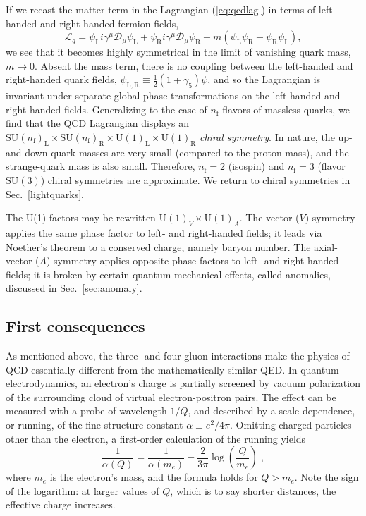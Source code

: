 \documentclass[prb,groupedaddress,nofootinbib,showpacs,twocolumn,floatfix]{revtex4}
\newcommand{\cfrac}[2]{{\textstyle \frac{#1}{#2}}}
\newcommand{\gtimes}{\times}
\newcommand{\D}{\ensuremath{\mathcal{D}}}
\begin{document}
If we recast the matter term in the Lagrangian (\ref{eq:qcdlag}) in
terms of left-handed and right-handed fermion fields,
\begin{equation}
	\mathcal{L}_{q} =
		\bar{\psi}_{\mathrm{L}}i\gamma^{\mu}\D_{\mu}\psi_{\mathrm{L}}
		+ \bar{\psi}_{\mathrm{R}}i\gamma^{\mu}\D_{\mu}\psi_{\mathrm{R}}
		-m\left(\bar{\psi}_{\mathrm{L}}\psi_{\mathrm{R}} +
		\bar{\psi}_{\mathrm{R}}\psi_{\mathrm{L}} \right),
    \label{eq:chiral}
\end{equation}
we see that it becomes highly symmetrical in the limit of vanishing
quark mass, $m \to 0$. Absent the mass term, there is no coupling
between the left-handed and right-handed quark fields,
$\psi_{\mathrm{L,R}} \equiv \cfrac{1}{2}(1 \mp \gamma_5)\psi$, and so
the Lagrangian is invariant under separate global phase transformations
on the left-handed and right-handed fields. Generalizing to the case of
$n_{\mathrm{f}}$ flavors of massless quarks, we find that the QCD
Lagrangian displays an
$\mathrm{SU(\mathit{n}_{\mathrm{f}})_L}\gtimes%
\mathrm{SU(\mathit{n}_{\mathrm{f}})_R}\gtimes%
\mathrm{U(1)_L}\gtimes\mathrm{U(1)_R}$
\emph{chiral symmetry}.
In nature, the up- and down-quark masses are very small (compared to 
the proton mass), and the strange-quark mass is also small.
Therefore, $n_{\mathrm{f}}=2$ (isospin) and $n_{\mathrm{f}}=3$ (flavor 
$\mathrm{SU}(3)$) chiral symmetries are approximate.
We return to chiral symmetries in Sec.~\ref{lightquarks}.

The U(1) factors may be rewritten $\mathrm{U}(1)_V\gtimes\mathrm{U}(1)_A$.
The vector ($V$) symmetry applies the same phase factor to left- and 
right-handed fields; it leads via Noether's theorem to a conserved 
charge, namely baryon number.
The axial-vector ($A$) symmetry applies opposite phase factors to left- 
and right-handed fields;
it is broken by certain quantum-mechanical effects, called anomalies, 
discussed in Sec.~\ref{sec:anomaly}.

\subsection{First consequences}
\label{sec:qcd:first}

As mentioned above, the three- and four-gluon interactions make the 
physics of QCD essentially different from the mathematically similar QED.
In quantum electrodynamics, an electron's charge is partially screened
by vacuum polarization of the surrounding cloud of virtual
electron-positron pairs.
The effect can be measured with a probe of wavelength $1/Q$, 
and described by a scale dependence, or running, of the fine structure 
constant $\alpha\equiv e^2/4\pi$.
Omitting charged particles other than the electron, a first-order 
calculation of the running yields
\begin{equation}
    \frac{1}{\alpha(Q)} = \frac{1}{\alpha(m_e)} - 
        \frac{2}{3\pi} \log\left(\frac{Q}{m_e}\right)\;,
\end{equation}
where $m_e$ is the electron's mass, and the formula holds for $Q>m_e$.
Note the sign of the logarithm: at larger values of $Q$, which is to 
say shorter distances, the effective charge increases.
\end{document}
